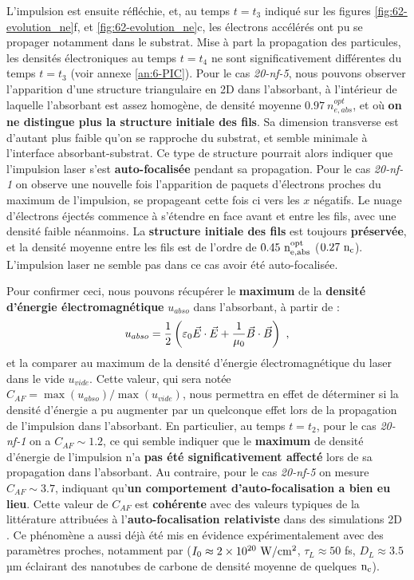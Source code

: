 \begin{refsection}
L'impulsion est ensuite réfléchie, et, au temps $t=t_3$ indiqué sur les figures \ref{fig:62-evolution_ne}f, et \ref{fig:62-evolution_ne}c, les électrons accélérés ont pu se propager notamment dans le substrat. Mise à part la propagation des particules, les densités électroniques au temps $t=t_4$ ne sont significativement différentes du temps $t=t_3$ (voir annexe \ref{an:6-PIC}). Pour le cas \textit{20-nf-5}, nous pouvons observer l'apparition d'une structure triangulaire en 2D dans l'absorbant, à l'intérieur de laquelle l'absorbant est assez homogène, de densité moyenne $0.97~ n_{e,abs}^{opt}$, et où \textbf{on ne distingue plus la structure initiale des fils}. Sa dimension transverse est d'autant plus faible qu'on se rapproche du substrat, et semble minimale à l'interface absorbant-substrat. Ce type de structure pourrait alors indiquer que l'impulsion laser s'est \textbf{auto-focalisée} pendant sa propagation. Pour le cas \textit{20-nf-1} on observe une nouvelle fois l'apparition de paquets d'électrons proches du maximum de l'impulsion, se propageant cette fois ci vers les $x$ négatifs. Le nuage d'électrons éjectés commence à s'étendre en face avant et entre les fils, avec une densité faible néanmoins. La \textbf{structure initiale des fils} est toujours \textbf{préservée}, et la densité moyenne entre les fils est de l'ordre de $0.45 ~ \rm n_{e,abs}^{opt}$ ($0.27 ~ \rm n_c$). L'impulsion laser ne semble pas dans ce cas avoir été auto-focalisée.

Pour confirmer ceci, nous pouvons récupérer le \textbf{maximum} de la \textbf{densité d'énergie électromagnétique} $u_{abso}$ dans l'absorbant, à partir de \parencite{taillet_2013} :
\begin{equation}
    u_{abso}= \dfrac{1}{2} \left(\varepsilon_0 \vec{E}\cdot\vec{E}  + \dfrac{1}{\mu_0}\vec{B} \cdot \vec{B}\right) ~ \rm ,
\end{equation}
et la comparer au maximum de la densité d'énergie électromagnétique du laser dans le vide $u_{vide}$. Cette valeur, qui sera notée $C_{AF}=\max(u_{abso})/\max(u_{vide})$, nous permettra en effet de déterminer si la densité d'énergie a pu augmenter par un quelconque effet lors de la propagation de l'impulsion dans l'absorbant. En particulier, au temps $t=t_2$, pour le cas \textit{20-nf-1} on a $C_{AF} \sim 1.2$, ce qui semble indiquer que le \textbf{maximum} de densité d'énergie de l'impulsion n'a \textbf{pas été significativement affecté} lors de sa propagation dans l'absorbant. Au contraire, pour le cas \textit{20-nf-5} on mesure  $C_{AF} \sim 3.7$, indiquant qu'\textbf{un comportement d'auto-focalisation a bien eu lieu}. Cette valeur de $C_{AF}$ est \textbf{cohérente} avec des valeurs typiques de la littérature attribuées à l'\textbf{auto-focalisation relativiste} dans des simulations 2D \parencite{fedeli_2018c, huang_2018}. Ce phénomène a aussi déjà été mis en évidence expérimentalement avec des paramètres proches, notamment par \cite{bin_2015} ($I_0 \approx 2 \times 10^{20} ~ \rm W/cm^2$, $\tau_L \approx 50 $ fs, $D_L \approx 3.5$ µm éclairant des nanotubes de carbone de densité moyenne de quelques $\rm n_c$). 


\end{refsection}
